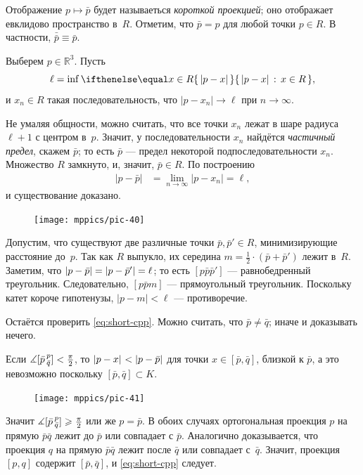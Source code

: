 Отображение $p\mapsto \bar p$ будет называеться \label{проекция на ближайшую точку}\emph{короткой проекцией};
оно отображает евклидово пространство в~$R$.
Отметим, что $\bar p=p$ для любой точки $p\in R$.
В частности, $\bar{\bar p}\equiv\bar p$.

Выберем $p\in \mathbb{R}^3$.
Пусть 
\[\ell=\inf\set{|p-x|}{x\in R},\]
и $x_n\in R$ такая последовательность, что $|p-x_n|\to \ell$ при $n\to\infty$.

Не умаляя общности, можно считать, что все точки $x_n$ лежат в шаре радиуса $\ell+1$ с центром в~$p$.
Значит, у последовательности $x_n$ найдётся \emph{частичный предел}, скажем $\bar p$;
то есть $\bar p$ --- предел некоторой подпоследовательности $x_n$.
Множество $R$ замкнуто, и, значит, $\bar p\in R$.
По построению 
\begin{align*}
|p-\bar p|&=\lim_{n\to\infty}|p-x_n|=\ell,
\end{align*}
и существование доказано.

{

\begin{figure}
\vskip-0mm
\centering
\texttt{[image: mppics/pic-40]}
\vskip-0mm
\end{figure}

Допустим, что существуют две различные точки $\bar p, \bar p'\in R$, минимизирующие расстояние до~$p$.
Так как $R$ выпукло, их середина $m=\tfrac12\cdot (\bar p+\bar p')$ лежит в~$R$.
Заметим, что $|p-\bar p|\z=|p-\bar p'|=\ell$;
то есть $[p\bar p\bar p']$ --- равнобедренный треугольник.
Следовательно, $[p\bar p m]$ --- прямоугольный треугольник.
Поскольку катет короче гипотенузы, $|p-m|<\ell$ --- противоречие. 

Остаётся проверить \ref{eq:short-cpp}.
Можно считать, что $\bar p\ne\bar q$; иначе и доказывать нечего.

}

Если $\measuredangle [\bar p\,{}^{p}_{\bar q}]< \tfrac\pi2$, то $\dist{p}{x}{}\z<\dist{p}{\bar p}{}$ для точки $x\in [\bar p,\bar q]$, близкой к $\bar p$,
а это невозможно поскольку $[\bar p,\bar q]\subset K$.

{

\begin{figure}
\vskip-8mm
\centering
\texttt{[image: mppics/pic-41]}
\vskip-0mm
\end{figure}

Значит $\measuredangle [\bar p\,{}^{p}_{\bar q}]\geqslant \tfrac\pi2$ или же $p=\bar p$.
В обоих случаях ортогональная проекция $p$ на прямую $\bar p\bar q$ лежит до $\bar p$ или совпадает с $\bar p$.
Аналогично доказывается, что проекция $q$ на прямую $\bar p\bar q$ лежит после $\bar q$ или совпадает с~$\bar q$.
Значит, проекция $[p,q]$ содержит $[\bar p,\bar q]$,
и \ref{eq:short-cpp} следует.
\qeds

}

